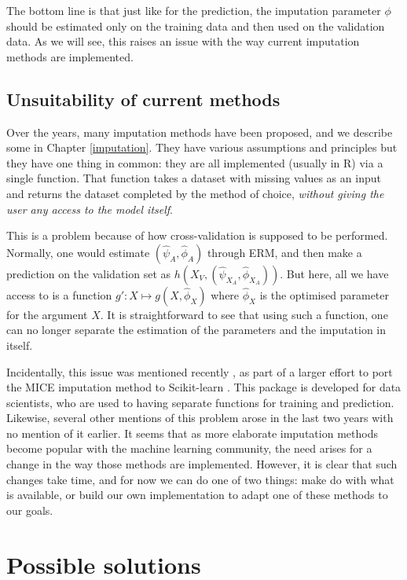 \documentclass[12pt, a4paper]{memoir}
\begin{document}
The bottom line is that just like for the prediction, the imputation parameter $\phi$ should be estimated only on the training data and then used on the validation data. As we will see, this raises an issue with the way current imputation methods are implemented.

		\subsection{Unsuitability of current methods}
Over the years, many imputation methods have been proposed, and we describe some in Chapter \ref{imputation}. They have various assumptions and principles but they have one thing in common: they are all implemented (usually in R) via a single function. That function takes a dataset with missing values as an input and returns the dataset completed by the method of choice, \emph{without giving the user any access to the model itself}.

This is a problem because of how cross-validation is supposed to be performed. Normally, one would estimate $(\hat{\psi}_A, \hat{\phi}_A)$ through ERM, and then make a prediction on the validation set as $h(X_V,(\hat{\psi}_{X_A},\hat{\phi}_{X_A}))$. But here, all we have access to is a function $g': X \mapsto g(X, \hat{\phi}_X)$ where $\hat{\phi}_X$ is the optimised parameter for the argument $X$. It is straightforward to see that using such a function, one can no longer separate the estimation of the parameters and the imputation in itself.
	
Incidentally, this issue was mentioned recently \cite{github_sklearn}, as part of a larger effort to port the MICE \cite{MICE_founding} imputation method to Scikit-learn \cite{scikit-learn}. This package is developed for data scientists, who are used to having separate functions for training and prediction. Likewise, several other mentions of this problem arose in the last two years \cite{thread_newdata1}\cite{thread_newdata2}\cite{thread_newdata3} with no mention of it earlier. It seems that as more elaborate imputation methods become popular with the machine learning community, the need arises for a change in the way those methods are implemented. However, it is clear that such changes take time, and for now we can do one of two things: make do with what is available, or build our own implementation to adapt one of these methods to our goals.
	\section{Possible solutions}
\end{document}

